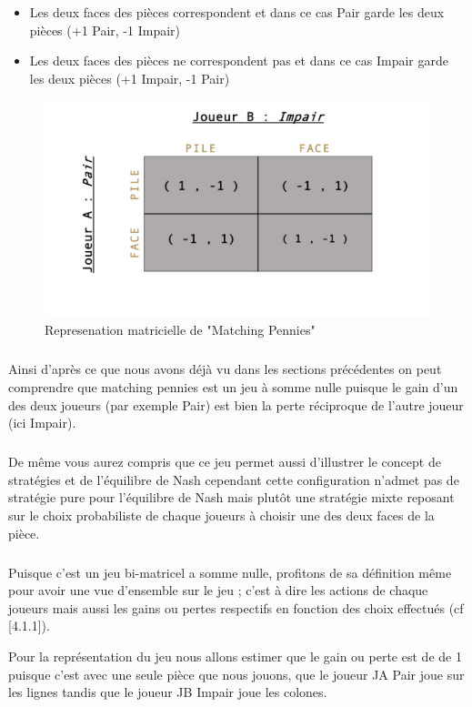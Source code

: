 \documentclass[a4paper, 12pt, twoside]{article}
\begin{document}
{\begin{itemize}
\item Les deux faces des pièces correspondent et dans ce cas Pair garde les deux pièces (+1 Pair, -1 Impair)
\item Les deux faces des pièces ne correspondent pas et dans ce cas Impair garde les deux pièces (+1 Impair, -1 Pair)
\end{itemize}  \vspace{0.2 cm}

\begin{figure}[h!]
\centering
\includegraphics[scale=0.4]{Matching.pdf}
\caption{Represenation matricielle de "Matching Pennies"}
\end{figure} 

\subparagraph*{}{Ainsi d'après ce que nous avons déjà vu dans les sections précédentes on peut comprendre que \textsf{matching pennies} est un jeu à somme nulle puisque le gain d'un des deux joueurs (par exemple Pair) est bien la perte réciproque de l'autre joueur (ici Impair).} 
\subparagraph*{}{De même vous aurez compris que ce jeu permet aussi d'illustrer le concept  de stratégies et de l'\textsf{équilibre de Nash} cependant cette configuration n'admet pas de stratégie pure pour l'\textsf{équilibre de Nash} mais plutôt une stratégie mixte reposant sur le choix probabiliste de chaque joueurs à choisir une des deux faces de la pièce.}

\subparagraph*{}{Puisque c'est un jeu bi-matricel a somme nulle, profitons de sa définition même pour avoir une vue d'ensemble sur le jeu ; c'est à dire les actions de chaque joueurs mais aussi les gains ou pertes respectifs en fonction des choix effectués (cf [4.1.1]).} \newline

Pour la représentation du jeu nous allons estimer que le gain ou perte est de de 1 puisque c'est avec une seule pièce que nous jouons, que le joueur JA \textsf{Pair} joue sur les lignes tandis que le joueur JB \textsf{Impair} joue les colones.  \vspace{0.4 cm}

}
\end{document}
